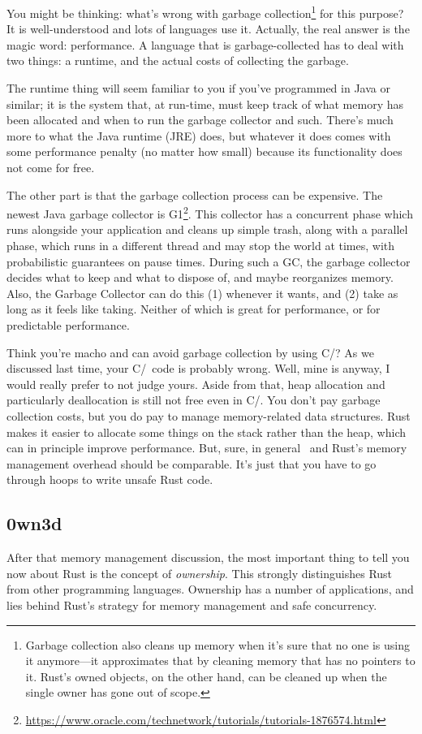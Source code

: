 You might be thinking: what's wrong with garbage collection\footnote{Garbage collection also cleans up memory when it's sure that no one is using it anymore---it approximates that by cleaning memory that has no pointers to it. Rust's owned objects, on the other hand, can be cleaned up when the single owner has gone out of scope.} for this purpose? It is well-understood and lots of languages use it. Actually, the real answer is the magic word: performance. A language that is garbage-collected has to deal with two things: a runtime, and the actual costs of collecting the garbage.

The runtime thing will seem familiar to you if you've programmed in Java or similar; it is the system that, at run-time, must keep track of what memory has been allocated and when to run the garbage collector and such. There's much more to what the Java runtime (JRE) does, but whatever it does comes with some performance penalty (no matter how small) because its functionality does not come for free. 

The other part is that the garbage collection process can be expensive. The newest Java garbage collector is G1\footnote{\url{https://www.oracle.com/technetwork/tutorials/tutorials-1876574.html}}. This collector has a concurrent phase which runs alongside your application and cleans up simple trash, along with a parallel phase, which runs in a different thread and may stop the world at times, with probabilistic guarantees on pause times. During such a GC, the garbage collector decides what to keep and what to dispose of, and maybe reorganizes memory.  Also, the Garbage Collector can do this (1) whenever it wants, and (2) take as long as it feels like taking. Neither of which is great for performance, or for predictable performance.

Think you're macho and can avoid garbage collection by using C/\CPP? As we discussed last time, your C/\CPP~code is probably wrong. Well, mine is anyway, I would really prefer to not judge yours. Aside from that, heap allocation and particularly deallocation is still not free even in C/\CPP. You don't pay garbage collection costs, but you do pay to manage memory-related data structures. Rust makes it easier to allocate some things on the stack rather than the heap, which can in principle improve performance. But, sure, in general \CPP~and Rust's memory management overhead should be comparable. It's just that you have to go through hoops to write unsafe Rust code.

\subsection*{0wn3d} After that memory management discussion, the most important thing to tell you now about Rust is the concept of \textit{ownership}. This strongly distinguishes Rust from other programming languages. Ownership has a number of applications, and lies behind Rust's strategy for memory management and safe concurrency.


